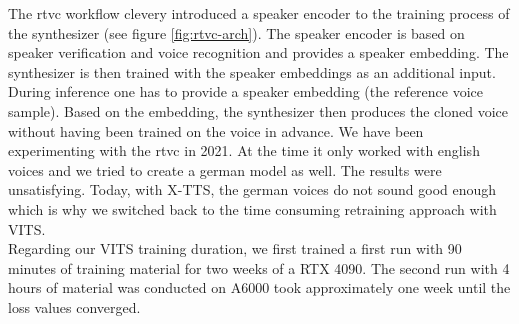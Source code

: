 \documentclass[
  a4paper,  %
  twoside,  %
  bibliography=totoc,
  headsepline,
  cleardoublepage=empty,
  parskip=half,
  draft=false
]{scrbook}
\begin{document}
The \gls{rtvc} workflow clevery introduced a speaker encoder to the training process of the synthesizer (see figure \ref{fig:rtvc-arch}). The speaker encoder is based on speaker verification and voice recognition and provides a speaker embedding. The synthesizer is then trained with the speaker embeddings as an additional input. During inference one has to provide a speaker embedding (the reference voice sample). Based on the embedding, the synthesizer then produces the cloned voice without having been trained on the voice in advance. We have been experimenting with the \gls{rtvc} in 2021. At the time it only worked with english voices and we tried to create a german model as well. The results were unsatisfying. Today, with X-TTS, the german voices do not sound good enough which is why we switched back to the time consuming retraining approach with VITS. \\
Regarding our VITS training duration, we first trained a first run with 90 minutes of training material for two weeks of a RTX 4090. The second run with 4 hours of material was conducted on A6000 took approximately one week until the loss values converged. 
\end{document}

